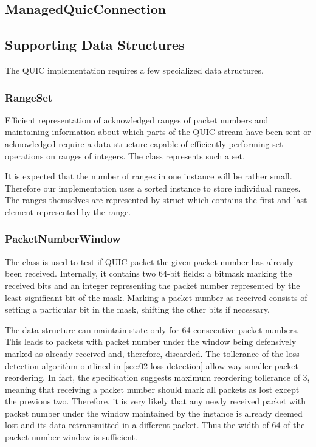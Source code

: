 \subsection{ManagedQuicConnection}

\subsection{Supporting Data Structures}

The QUIC implementation requires a few specialized data structures.


\subsubsection{RangeSet}

Efficient representation of acknowledged ranges of packet numbers and maintaining information about
which parts of the QUIC stream have been sent or acknowledged require a data structure capable of
efficiently performing set operations on ranges of integers. The \RangeSet{} class represents such a
set.

It is expected that the number of ranges in one \RangeSet{} instance will be rather small. Therefore
our implementation uses a sorted  instance to store individual ranges. The ranges
themselves are represented by  struct which contains the first and last
element represented by the range.

\subsubsection{PacketNumberWindow}

The \PacketNumberWindow{} class is used to test if QUIC packet the given packet number has already
been received. Internally, it contains two 64-bit fields: a bitmask marking the received bits and an
integer representing the packet number represented by the least significant bit of the mask. Marking
a packet number as received consists of setting a particular bit in the mask, shifting the other
bits if necessary. 

The data structure can maintain state only for 64 consecutive packet numbers. This leads to packets
with packet number under the window being defensively marked as already received and, therefore,
discarded. The tollerance of the loss detection algorithm outlined in
\autoref{sec:02-loss-detection} allow way smaller packet reordering. In fact, the specification
suggests maximum reordering tollerance of 3, meaning that receiving a packet number should mark all
packets as lost except the previous two. Therefore, it is very likely that any newly received packet
with packet number under the window maintained by the \PacketNumberWindow{} instance is already
deemed lost and its data retransmitted in a different packet. Thus the width of 64 of the packet
number window is sufficient.

